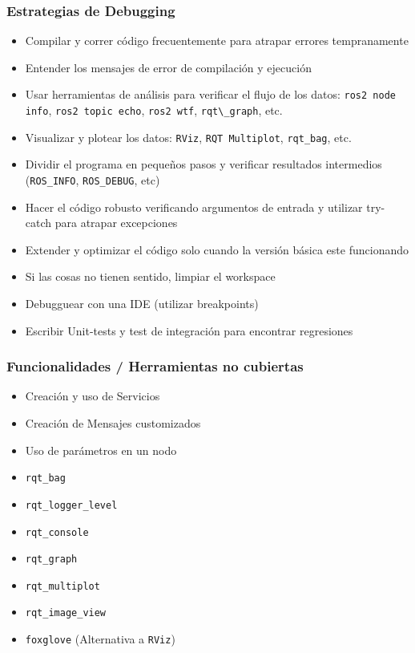 \begin{frame}
    \frametitle{Estrategias de Debugging}
    
    \begin{itemize}
        \item Compilar y correr código frecuentemente para atrapar errores tempranamente
        \item Entender los mensajes de error de compilación y ejecución
        \item Usar herramientas de análisis para verificar el flujo de los datos: \lstinline[style=bash]{ros2 node info}, \lstinline[style=bash]{ros2 topic echo}, \lstinline[style=bash]{ros2 wtf}, \lstinline[style=bash]{rqt\_graph}, etc.
        \item Visualizar y plotear los datos: \lstinline[style=bash]{RViz}, \lstinline[style=bash]{RQT Multiplot}, \lstinline[style=bash]{rqt_bag}, etc.
        \item Dividir el programa en pequeños pasos y verificar resultados intermedios (\lstinline[style=bash]{ROS_INFO}, \lstinline[style=bash]{ROS_DEBUG}, etc)
        \item Hacer el código robusto verificando argumentos de entrada y utilizar try-catch para atrapar excepciones
        \item Extender y optimizar el código solo cuando la versión básica este funcionando
        \item Si las cosas no tienen sentido, limpiar el workspace
        \item Debugguear con una IDE (utilizar breakpoints)
        \item Escribir Unit-tests y test de integración para encontrar regresiones
    \end{itemize}
    
\end{frame}

\begin{frame}
	\frametitle{Funcionalidades / Herramientas no cubiertas}
	
	\begin{itemize}
		\item Creación y uso de Servicios
		\item Creación de Mensajes customizados
		\item Uso de parámetros en un nodo
        \item \lstinline[style=bash]{rqt_bag}
		\item \lstinline[style=bash]{rqt_logger_level}
		\item \lstinline[style=bash]{rqt_console}
		\item \lstinline[style=bash]{rqt_graph}
		\item \lstinline[style=bash]{rqt_multiplot}
		\item \lstinline[style=bash]{rqt_image_view}
        \item \lstinline[style=bash]{foxglove} (Alternativa a \lstinline[style=bash]{RViz})
	\end{itemize}
	
\end{frame}


